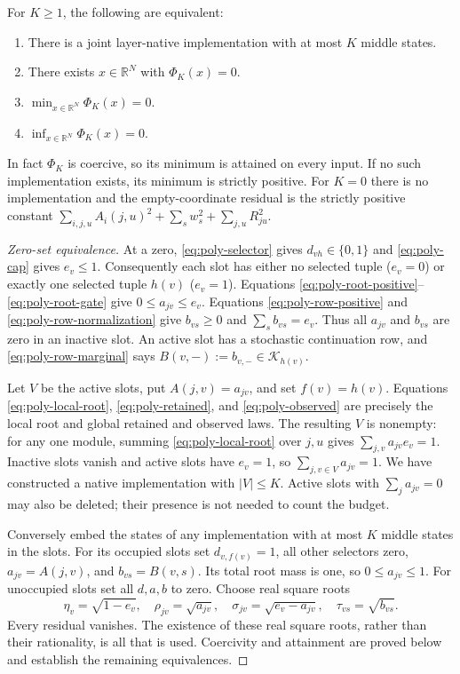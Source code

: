 \begin{theorem}
\label{thm:budget-zero}
For $K\ge1$, the following are equivalent:
\begin{enumerate}
\item There is a joint layer-native implementation with at most $K$ middle states.
\item There exists $x\in\mathbb R^N$ with $\Phi_K(x)=0$.
\item $\min_{x\in\mathbb R^N}\Phi_K(x)=0$.
\item $\inf_{x\in\mathbb R^N}\Phi_K(x)=0$.
\end{enumerate}
In fact $\Phi_K$ is coercive, so its minimum is attained on every input.
If no such implementation exists, its minimum is strictly positive.
For $K=0$ there is no implementation and the empty-coordinate residual is
the strictly positive constant
$\sum_{i,j,u}A_i(j,u)^2+\sum_sw_s^2+\sum_{j,u}R_{ju}^2$.
\end{theorem}

\begin{proof}[Zero-set equivalence]
At a zero, \eqref{eq:poly-selector} gives $d_{vh}\in\{0,1\}$ and
\eqref{eq:poly-cap} gives $e_v\le1$. Consequently each slot has either no
selected tuple ($e_v=0$) or exactly one selected tuple $h(v)$ ($e_v=1$).
Equations \eqref{eq:poly-root-positive}--\eqref{eq:poly-root-gate} give
$0\le a_{jv}\le e_v$. Equations \eqref{eq:poly-row-positive} and
\eqref{eq:poly-row-normalization} give $b_{vs}\ge0$ and
$\sum_sb_{vs}=e_v$. Thus all $a_{jv}$ and $b_{vs}$ are zero in an inactive
slot. An active slot has a stochastic continuation row, and
\eqref{eq:poly-row-marginal} says
$B(v,-):=b_{v,-}\in\mathcal K_{h(v)}$.

Let $V$ be the active slots, put $A(j,v)=a_{jv}$, and set $f(v)=h(v)$.
Equations \eqref{eq:poly-local-root}, \eqref{eq:poly-retained}, and
\eqref{eq:poly-observed} are precisely the local root and global retained
and observed laws. The resulting $V$ is nonempty: for any one module,
summing \eqref{eq:poly-local-root} over $j,u$ gives
$\sum_{j,v}a_{jv}e_v=1$. Inactive slots vanish and active slots have $e_v=1$,
so $\sum_{j,v\in V}a_{jv}=1$. We have constructed a native implementation
with $|V|\le K$. Active slots with $\sum_ja_{jv}=0$ may also be deleted;
their presence is not needed to count the budget.

Conversely embed the states of any implementation with at most $K$ middle
states in the slots. For its occupied slots set $d_{v,f(v)}=1$, all other
selectors zero, $a_{jv}=A(j,v)$, and $b_{vs}=B(v,s)$. Its total root mass is
one, so $0\le a_{jv}\le1$. For unoccupied slots set all $d,a,b$ to zero.
Choose real square roots
\[
 \eta_v=\sqrt{1-e_v},\quad
 \rho_{jv}=\sqrt{a_{jv}},\quad
 \sigma_{jv}=\sqrt{e_v-a_{jv}},\quad
 \tau_{vs}=\sqrt{b_{vs}}.
\]
Every residual vanishes. The existence of these real square roots, rather
than their rationality, is all that is used. Coercivity and attainment are
proved below and establish the remaining equivalences.
\end{proof}

